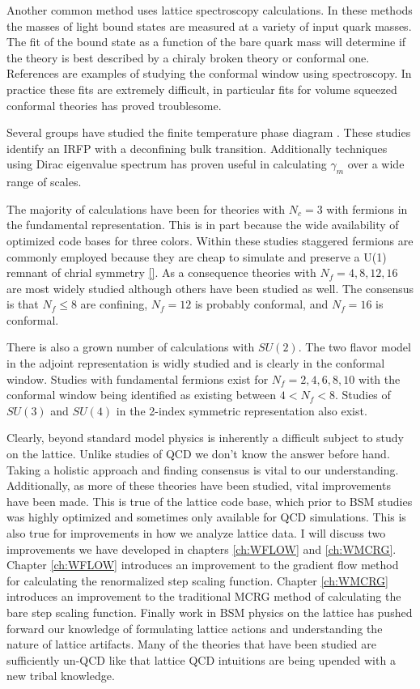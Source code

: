 Another common method uses lattice spectroscopy calculations.
In these methods the masses of light bound states are measured at a variety of input quark masses.
The fit of the bound state as a function of the bare quark mass will determine if the theory is best described by a chiraly broken theory or conformal one.
References \cite{Jin:2008rc,Jin:2009mc,Fodor:2010zzb} are examples of studying the conformal window using spectroscopy.
In practice these fits are extremely difficult, in particular fits for volume squeezed conformal theories has proved troublesome.

Several groups have studied the finite temperature phase diagram \cite{Iwasaki:2003de,Schaich:2012fr}.
These studies identify an IRFP with a deconfining bulk transition.
Additionally techniques using Dirac eigenvalue spectrum \cite{Cheng:2013eu} has proven useful in calculating $\gamma_m$ over a wide range of scales.

The majority of calculations have been for theories with $N_c=3$ with fermions in the fundamental representation.
This is in part because the wide availability of optimized code bases for three colors.
Within these studies staggered fermions are commonly employed because they are cheap to simulate and preserve a U(1) remnant of chrial symmetry \ref{}.
As a consequence theories with $N_f=4,8,12,16$ are most widely studied although others have been studied as well.
The consensus is that $N_f\le8$ are confining, $N_f=12$ is probably conformal, and $N_f=16$ is conformal.

There is also a grown number of calculations with $SU(2)$.
The two flavor model in the adjoint representation is widly studied and is clearly in the conformal window\cite{Catterall:2007yx,DelDebbio:2010hu,DeGrand:2011qd,DeGrand:2011vp}.
Studies with fundamental fermions exist for $N_f=2,4,6,8,10$ with the conformal window being identified as existing between $4<N_f<8$.
Studies of $SU(3)$ and $SU(4)$ in the 2-index symmetric representation also exist.

Clearly, beyond standard model physics is inherently a difficult subject to study on the lattice.
Unlike studies of QCD we don't know the answer before hand.
Taking a holistic approach and finding consensus is vital to our understanding.
Additionally, as more of these theories have been studied, vital improvements have been made.
This is true of the lattice code base, which prior to BSM studies was highly optimized and sometimes only available for QCD simulations.
This is also true for improvements in how we analyze lattice data.
I will discuss two improvements we have developed in chapters \ref{ch:WFLOW} and \ref{ch:WMCRG}.
Chapter \ref{ch:WFLOW} introduces an improvement to the gradient flow method for calculating the renormalized step scaling function.
Chapter \ref{ch:WMCRG} introduces an improvement to the traditional MCRG method of calculating the bare step scaling function.
Finally work in BSM physics on the lattice has pushed forward our knowledge of formulating lattice actions and understanding the nature of lattice artifacts.
Many of the theories that have been studied are sufficiently un-QCD like that lattice QCD intuitions are being upended with a new tribal knowledge.
